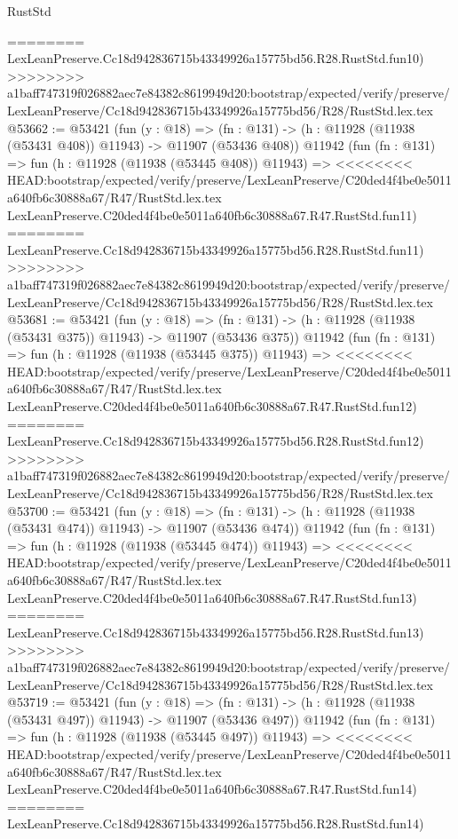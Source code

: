 \begin{lexlean}{RustStd}
\begin{coremodule}
{\begin{coremodule}
{{{{{{{{{{{{{{{{{{{{{{{{{{{{{{{{{{{{{{{{{{{{{{{{{{{{{{{{{{{{{{{{{{{{{{{{{{{{{{{{========
    LexLeanPreserve.Cc18d942836715b43349926a15775bd56.R28.RustStd.fun10)
>>>>>>>> a1baff747319f026882aec7e84382c8619949d20:bootstrap/expected/verify/preserve/LexLeanPreserve/Cc18d942836715b43349926a15775bd56/R28/RustStd.lex.tex
@53662 := @53421
    (fun (y : @18) =>
    (fn : @131) -> (h : @11928 (@11938 (@53431 @408)) @11943) -> @11907 (@53436 @408))
    @11942
    (fun (fn : @131) =>
    fun (h : @11928 (@11938 (@53445 @408)) @11943) =>
<<<<<<<< HEAD:bootstrap/expected/verify/preserve/LexLeanPreserve/C20ded4f4be0e5011a640fb6c30888a67/R47/RustStd.lex.tex
    LexLeanPreserve.C20ded4f4be0e5011a640fb6c30888a67.R47.RustStd.fun11)
========
    LexLeanPreserve.Cc18d942836715b43349926a15775bd56.R28.RustStd.fun11)
>>>>>>>> a1baff747319f026882aec7e84382c8619949d20:bootstrap/expected/verify/preserve/LexLeanPreserve/Cc18d942836715b43349926a15775bd56/R28/RustStd.lex.tex
@53681 := @53421
    (fun (y : @18) =>
    (fn : @131) -> (h : @11928 (@11938 (@53431 @375)) @11943) -> @11907 (@53436 @375))
    @11942
    (fun (fn : @131) =>
    fun (h : @11928 (@11938 (@53445 @375)) @11943) =>
<<<<<<<< HEAD:bootstrap/expected/verify/preserve/LexLeanPreserve/C20ded4f4be0e5011a640fb6c30888a67/R47/RustStd.lex.tex
    LexLeanPreserve.C20ded4f4be0e5011a640fb6c30888a67.R47.RustStd.fun12)
========
    LexLeanPreserve.Cc18d942836715b43349926a15775bd56.R28.RustStd.fun12)
>>>>>>>> a1baff747319f026882aec7e84382c8619949d20:bootstrap/expected/verify/preserve/LexLeanPreserve/Cc18d942836715b43349926a15775bd56/R28/RustStd.lex.tex
@53700 := @53421
    (fun (y : @18) =>
    (fn : @131) -> (h : @11928 (@11938 (@53431 @474)) @11943) -> @11907 (@53436 @474))
    @11942
    (fun (fn : @131) =>
    fun (h : @11928 (@11938 (@53445 @474)) @11943) =>
<<<<<<<< HEAD:bootstrap/expected/verify/preserve/LexLeanPreserve/C20ded4f4be0e5011a640fb6c30888a67/R47/RustStd.lex.tex
    LexLeanPreserve.C20ded4f4be0e5011a640fb6c30888a67.R47.RustStd.fun13)
========
    LexLeanPreserve.Cc18d942836715b43349926a15775bd56.R28.RustStd.fun13)
>>>>>>>> a1baff747319f026882aec7e84382c8619949d20:bootstrap/expected/verify/preserve/LexLeanPreserve/Cc18d942836715b43349926a15775bd56/R28/RustStd.lex.tex
@53719 := @53421
    (fun (y : @18) =>
    (fn : @131) -> (h : @11928 (@11938 (@53431 @497)) @11943) -> @11907 (@53436 @497))
    @11942
    (fun (fn : @131) =>
    fun (h : @11928 (@11938 (@53445 @497)) @11943) =>
<<<<<<<< HEAD:bootstrap/expected/verify/preserve/LexLeanPreserve/C20ded4f4be0e5011a640fb6c30888a67/R47/RustStd.lex.tex
    LexLeanPreserve.C20ded4f4be0e5011a640fb6c30888a67.R47.RustStd.fun14)
========
    LexLeanPreserve.Cc18d942836715b43349926a15775bd56.R28.RustStd.fun14)
}}}}}}}}}}}}}}}}}}}}}}}}}}}}}}}}}}}}}}}}}}}}}}}}}}}}}}}}}}}}}}}}}}}}}}}}}}}}}}}}
\end{coremodule}}
\end{coremodule}
\end{lexlean}
